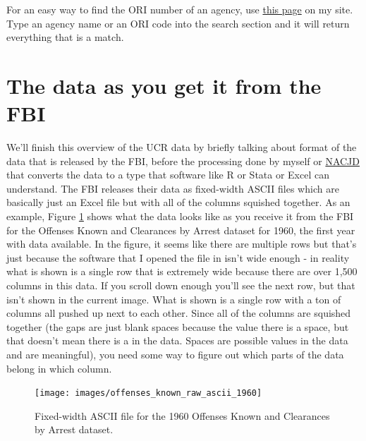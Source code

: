 \documentclass[
  12pt,
  openany]{book}
\begin{document}
For an easy way to find the ORI number of an agency, use \href{https://jacobdkaplan.com/crosswalk.html}{this page} on my site. Type an agency name or an ORI code into the search section and it will return everything that is a match.

\hypertarget{the-data-as-you-get-it-from-the-fbi}{%
\section{The data as you get it from the FBI}\label{the-data-as-you-get-it-from-the-fbi}}

We'll finish this overview of the UCR data by briefly talking about format of the data that is released by the FBI, before the processing done by myself or \href{https://www.icpsr.umich.edu/web/pages/NACJD/index.html}{NACJD} that converts the data to a type that software like R or Stata or Excel can understand. The FBI releases their data as fixed-width ASCII files which are basically just an Excel file but with all of the columns squished together. As an example, Figure \ref{fig:ascii} shows what the data looks like as you receive it from the FBI for the Offenses Known and Clearances by Arrest dataset for 1960, the first year with data available. In the figure, it seems like there are multiple rows but that's just because the software that I opened the file in isn't wide enough - in reality what is shown is a single row that is extremely wide because there are over 1,500 columns in this data. If you scroll down enough you'll see the next row, but that isn't shown in the current image. What is shown is a single row with a ton of columns all pushed up next to each other. Since all of the columns are squished together (the gaps are just blank spaces because the value there is a space, but that doesn't mean there is a in the data. Spaces are possible values in the data and are meaningful), you need some way to figure out which parts of the data belong in which column.

\begin{figure}

{\centering \texttt{[image: images/offenses\_known\_raw\_ascii\_1960]} 

}

\caption{Fixed-width ASCII file for the 1960 Offenses Known and Clearances by Arrest dataset.}\label{fig:ascii}
\end{figure}
\end{document}
